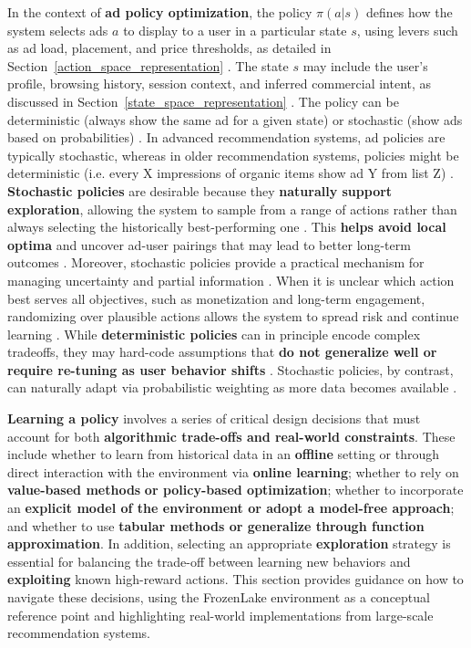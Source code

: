 \documentclass[final]{anthology-ch}         %
\begin{document}
In the context of \textbf{ad policy optimization}, the policy $\pi(a|s)$ defines how the system selects ads $a$ to display to a user in a particular state $s$, using levers such as ad load, placement, and price thresholds, as detailed in Section~\ref{action_space_representation} \cite{zhang2018whole, zhao2021dear, ie2019reinforcement}. The state $s$ may include the user’s profile, browsing history, session context, and inferred commercial intent, as discussed in Section~\ref{state_space_representation} \cite{pancha2022pinnerformer, xia2023transact, Zhou2019}. The policy can be deterministic (always show the same ad for a given state) or stochastic (show ads based on probabilities) \cite{Sutton1998, levine2020offline}. In advanced recommendation systems, ad policies are typically stochastic, whereas in older recommendation systems, policies might be deterministic (i.e. every X impressions of organic items show ad Y from list Z) \cite{gauci2018horizon, zhao2021dear}.  \textbf{Stochastic policies} are desirable because they \textbf{naturally support exploration}, allowing the system to sample from a range of actions rather than always selecting the historically best-performing one \cite{Sutton1998, russo2018tutorial}. This \textbf{helps avoid local optima} and uncover ad-user pairings that may lead to better long-term outcomes \cite{zou2019reinforcement, mazoure2021improving}. Moreover, stochastic policies provide a practical mechanism for managing uncertainty and partial information \cite{dulac2021challenges, levine2020offline}. When it is unclear which action best serves all objectives, such as monetization and long-term engagement, randomizing over plausible actions allows the system to spread risk and continue learning \cite{Mehrotra2020, Jannach2023}. While \textbf{deterministic policies} can in principle encode complex tradeoffs, they may hard-code assumptions that \textbf{ do not generalize well or require re-tuning as user behavior shifts }\cite{dulac2021challenges}. Stochastic policies, by contrast, can naturally adapt via probabilistic weighting as more data becomes available \cite{levine2020offline, gauci2018horizon}.


\textbf{Learning a policy} involves a series of critical design decisions that must account for both \textbf{algorithmic trade-offs and real-world constraints}. These include whether to learn from historical data in an \textbf{offline} setting or through direct interaction with the environment via \textbf{online learning}; whether to rely on \textbf{value-based methods} \textbf{or policy-based optimization}; whether to incorporate an \textbf{explicit model of the environment or adopt a model-free approach}; and whether to use \textbf{tabular methods or generalize through function approximation}. In addition, selecting an appropriate \textbf{exploration} strategy is essential for balancing the trade-off between learning new behaviors and \textbf{exploiting} known high-reward actions. This section provides guidance on how to navigate these decisions, using the FrozenLake environment as a conceptual reference point and highlighting real-world implementations from large-scale recommendation systems.
\end{document}
